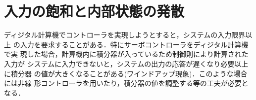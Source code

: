 \section{入力の飽和と内部状態の発散}
ディジタル計算機でコントローラを実現しようとすると，システムの入力限界以上
の入力を要求することがある．特にサーボコントローラをディジタル計算機で実
現した場合，計算機内に積分器が入っているため制御則により計算された入力が
システムに入力できないと，システムの出力の応答が遅くなり必要以上に積分器
の値が大きくなることがある(ワインドアップ現象)．このような場合には非線
形コントローラを用いたり，積分器の値を調整する等の工夫が必要となる．
